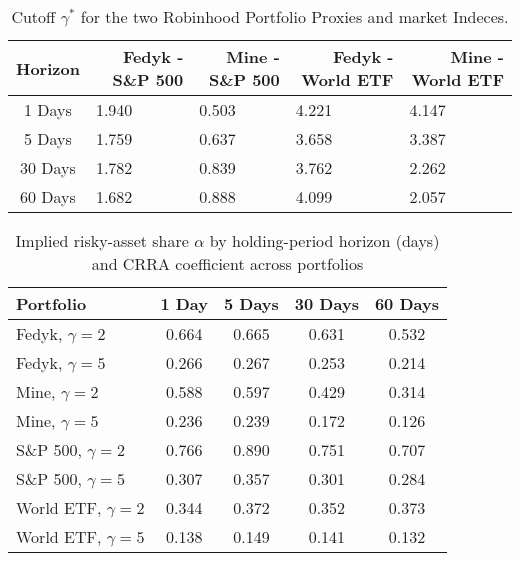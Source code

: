 \begin{appendices}
\begin{table}[ht]
\centering
\caption{Cutoff $\gamma^*$ for the two Robinhood Portfolio Proxies and market Indeces.}
\begin{tabular}{cllll}
    \toprule
    \multicolumn{1}{r}{\textbf{Horizon}} & \multicolumn{1}{r}{\textbf{Fedyk - S\&P 500}} & \multicolumn{1}{r}{\textbf{Mine - S\&P 500}} & \multicolumn{1}{r}{\textbf{Fedyk - World ETF}} & \multicolumn{1}{r}{\textbf{Mine - World ETF}} \\
    \midrule
    1 Days                        & 1.940                                         & 0.503                                          & 4.221                                          & 4.147                                           \\
    5 Days                        & 1.759                                         & 0.637                                          & 3.658                                          & 3.387                                           \\
    30 Days                       & 1.782                                         & 0.839                                          & 3.762                                          & 2.262                                           \\
    60 Days                       & 1.682                                         & 0.888                                          & 4.099                                          & 2.057                                          
\end{tabular}
\label{tab:cutoff_gamma}
\end{table}
    
\begin{table}[ht]
\centering
\caption{Implied risky-asset share $\alpha$ by holding-period horizon (days) and CRRA coefficient across portfolios}
\label{tab:gamma_implied}
\begin{tabular}{l|c c c c}
    \toprule
    \textbf{Portfolio} & \textbf{1 Day} & \textbf{5 Days} & \textbf{30 Days} & \textbf{60 Days} \\
    \midrule
    Fedyk, $\gamma=2$   & 0.664 & 0.665 & 0.631 & 0.532 \\
    Fedyk, $\gamma=5$   & 0.266 & 0.267 & 0.253 & 0.214 \\
    Mine,  $\gamma=2$   & 0.588 & 0.597 & 0.429 & 0.314 \\
    Mine,  $\gamma=5$   & 0.236 & 0.239 & 0.172 & 0.126 \\
    S\&P 500, $\gamma=2$ & 0.766 & 0.890 & 0.751 & 0.707 \\
    S\&P 500, $\gamma=5$ & 0.307 & 0.357 & 0.301 & 0.284 \\
    World ETF, $\gamma=2$& 0.344 & 0.372 & 0.352 & 0.373 \\
    World ETF, $\gamma=5$& 0.138 & 0.149 & 0.141 & 0.132 \\
    \end{tabular}
\end{table}
    

\end{appendices}
